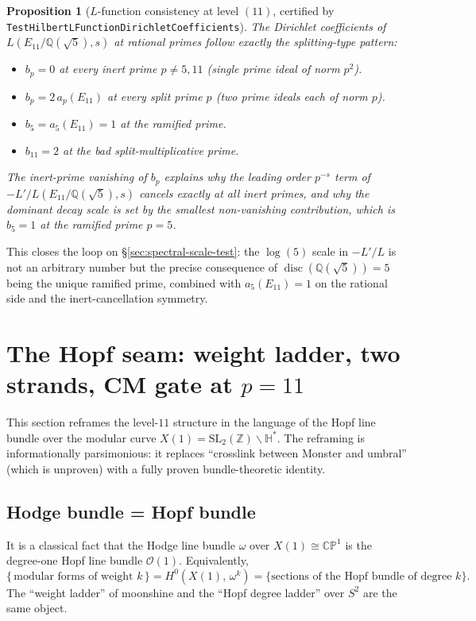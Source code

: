 \documentclass[11pt,a4paper]{article}
\theoremstyle{plain}
\newtheorem{proposition}[theorem]{Proposition}
\theoremstyle{definition}
\theoremstyle{remark}
\numberwithin{equation}{section}
\providecommand{\Qp}{\ensuremath{\mathbb{Q}(\sqrt{5})}}
\DeclareMathOperator{\disc}{disc}
\begin{document}
\begin{proposition}[$L$-function consistency at level $(11)$, certified by \texttt{TestHilbertLFunctionDirichletCoefficients}]
\label{prop:L-consistency}
The Dirichlet coefficients of $L(E_{11}/\Qp,s)$ at rational primes
follow exactly the splitting-type pattern:
\begin{itemize}\setlength{\itemsep}{0pt}
\item $b_{p}=0$ at every inert prime $p\ne 5,11$ (single prime ideal of norm $p^{2}$).
\item $b_{p}=2\,a_{p}(E_{11})$ at every split prime $p$ (two prime ideals each of norm $p$).
\item $b_{5}=a_{5}(E_{11})=1$ at the ramified prime.
\item $b_{11}=2$ at the bad split-multiplicative prime.
\end{itemize}
The inert-prime vanishing of $b_{p}$ explains why the leading order $p^{-s}$
term of $-L'/L(E_{11}/\Qp,s)$ \emph{cancels exactly} at all inert primes,
and why the dominant decay scale is set by the smallest non-vanishing
contribution, which is $b_{5}=1$ at the ramified prime $p=5$.
\end{proposition}

This closes the loop on \S\ref{sec:spectral-scale-test}: the $\log(5)$ scale
in $-L'/L$ is not an arbitrary number but the precise consequence of
$\disc(\Qp)=5$ being the unique ramified prime, combined with $a_{5}(E_{11})=1$
on the rational side and the inert-cancellation symmetry.

\section{The Hopf seam: weight ladder, two strands, CM gate at $p=11$}
\label{sec:hopf-seam}

This section reframes the level-$11$ structure in the language of the
Hopf line bundle over the modular curve $X(1) = \mathrm{SL}_2(\mathbb Z)\backslash \mathbb H^*$.
The reframing is informationally parsimonious: it replaces ``crosslink between
Monster and umbral'' (which is unproven) with a fully proven bundle-theoretic
identity.

\subsection*{Hodge bundle = Hopf bundle}

It is a classical fact that the Hodge line bundle $\omega$ over $X(1)\cong\mathbb{CP}^1$
is the degree-one Hopf line bundle $\mathcal{O}(1)$.  Equivalently,
\begin{equation}\label{eq:weight-as-section}
  \{\,\text{modular forms of weight }k\,\}=H^{0}(X(1),\,\omega^{k})
  =\{\text{sections of the Hopf bundle of degree }k\}.
\end{equation}
The ``weight ladder'' of moonshine and the ``Hopf degree ladder'' over $S^2$
are the same object.
\end{document}
